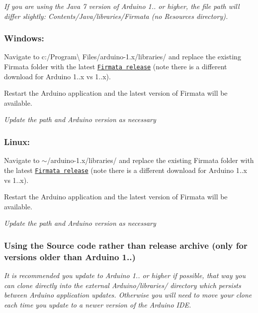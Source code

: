 {\itshape If you are using the Java 7 version of Arduino 1.. or higher, the file path will differ slightly\+: {\ttfamily Contents/\+Java/libraries/\+Firmata} (no Resources directory).}

\subsubsection*{Windows\+:}


\begin{DoxyEnumerate}
\item Navigate to {\ttfamily c\+:/\+Program\textbackslash{} Files/arduino-\/1.\+x/libraries/} and replace the existing {\ttfamily Firmata} folder with the latest \href{https://github.com/firmata/arduino/releases/tag/2.5.4}{\tt Firmata release} (note there is a different download for Arduino 1..\+x vs 1..\+x).
\item Restart the Arduino application and the latest version of Firmata will be available.
\end{DoxyEnumerate}

{\itshape Update the path and Arduino version as necessary}

\subsubsection*{Linux\+:}


\begin{DoxyEnumerate}
\item Navigate to {\ttfamily $\sim$/arduino-\/1.x/libraries/} and replace the existing {\ttfamily Firmata} folder with the latest \href{https://github.com/firmata/arduino/releases/tag/2.5.4}{\tt Firmata release} (note there is a different download for Arduino 1..\+x vs 1..\+x).
\item Restart the Arduino application and the latest version of Firmata will be available.
\end{DoxyEnumerate}

{\itshape Update the path and Arduino version as necessary}

\subsubsection*{Using the Source code rather than release archive (only for versions older than Arduino 1..)}

{\itshape It is recommended you update to Arduino 1.. or higher if possible, that way you can clone directly into the external Arduino/libraries/ directory which persists between Arduino application updates. Otherwise you will need to move your clone each time you update to a newer version of the Arduino I\+DE.}

